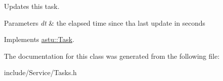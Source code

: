 Updates this task.


\begin{DoxyParams}{Parameters}
{\em dt} & the elapsed time since tha last update in seconds \\
\hline
\end{DoxyParams}


Implements \hyperlink{classastu_1_1Task_a2bcec3cc42b46cfcb03422e029577c0a}{astu\+::\+Task}.



The documentation for this class was generated from the following file\+:\begin{DoxyCompactItemize}
\item 
include/\+Service/Tasks.\+h\end{DoxyCompactItemize}
